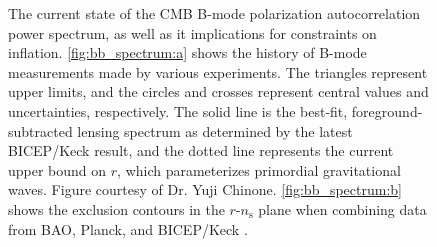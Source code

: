 \begin{figure}[!ht]
    \hfill
    \caption[Current state of the BB measurement and exclusion regions in the r vs $n_{\mathrm{s}}$ plane]{The current state of the CMB B-mode polarization autocorrelation power spectrum, as well as it implications for constraints on inflation. \ref{fig:bb_spectrum:a} shows the history of B-mode measurements made by various experiments. The triangles represent upper limits, and the circles and crosses represent central values and uncertainties, respectively. The solid line is the best-fit, foreground-subtracted lensing spectrum as determined by the latest BICEP/Keck result, and the dotted line represents the current upper bound on $r$, which parameterizes primordial gravitational waves. Figure courtesy of Dr. Yuji Chinone. \ref{fig:bb_spectrum:b} shows the exclusion contours in the $r$-$n_{\mathrm{s}}$ plane when combining data from BAO, Planck, and BICEP/Keck \cite{array_bicep2_2018}.}
    \label{fig:bb_spectrum}
\end{figure}
